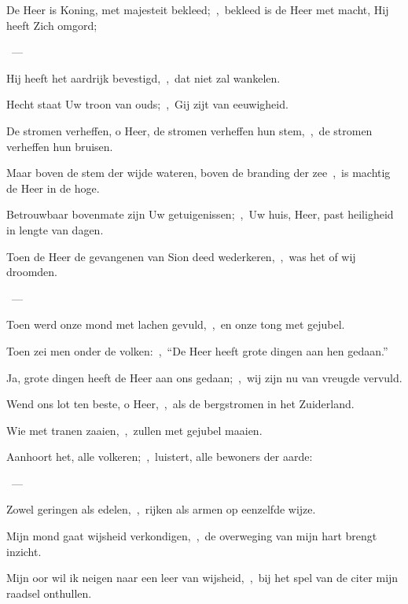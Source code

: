 \documentclass[12pt,twoside,a5paper]{article}
\begin{document}

\begin{halfparskip}
  De Heer is Koning, met majesteit bekleed;~\sep\ bekleed is de Heer met macht, Hij heeft Zich omgord;

  ~--- 

  Hij heeft het aardrijk bevestigd,~\sep\ dat niet zal wankelen.

  Hecht staat Uw troon van ouds;~\sep\ Gij zijt van eeuwigheid.

  De stromen verheffen, o Heer, de stromen verheffen hun stem,~\sep\ de stromen verheffen hun bruisen.

  Maar boven de stem der wijde wateren, boven de branding der zee~\sep\ is machtig de Heer in de hoge.

  Betrouwbaar bovenmate zijn Uw getuigenissen;~\sep\ Uw huis, Heer, past heiligheid in lengte van dagen.
\end{halfparskip}


\begin{halfparskip}
  Toen de Heer de gevangenen van Sion deed wederkeren,~\sep\ was het of wij droomden.

  ~--- 

  Toen werd onze mond met lachen gevuld,~\sep\ en onze tong met gejubel.

  Toen zei men onder de volken:~\sep\ ``De Heer heeft grote dingen aan hen gedaan.''

  Ja, grote dingen heeft de Heer aan ons gedaan;~\sep\ wij zijn nu van vreugde vervuld.

  Wend ons lot ten beste, o Heer,~\sep\ als de bergstromen in het Zuiderland.

  Wie met tranen zaaien,~\sep\ zullen met gejubel maaien.
\end{halfparskip}


\begin{halfparskip}
  Aanhoort het, alle volkeren;~\sep\ luistert, alle bewoners der aarde:

  ~--- 

  Zowel geringen als edelen,~\sep\ rijken als armen op eenzelfde wijze.

  Mijn mond gaat wijsheid verkondigen,~\sep\ de overweging van mijn hart brengt inzicht.

  Mijn oor wil ik neigen naar een leer van wijsheid,~\sep\ bij het spel van de citer mijn raadsel onthullen.
\end{halfparskip}
\end{document}
